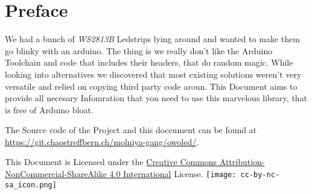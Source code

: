 \section*{Preface}
We had a bunch of \textit{WS2813B} Led\-strips lying around and wanted to make them go blinky with an arduino.
The thing is we really don't like the Arduino Toolchain and code that includes their headers, that do random magic.
While looking into alternatives we discovered that most existing solutions weren't very versatile and relied on  copying third party code aroun.
\bigbreak
This Document aims to provide all necesary Infomration that you need to use this marvelous library, that is free of Arduino bloat. 

The Source code of the Project and this doccument can be found at \url{https://git.chaostreffbern.ch/molniya-gang/owoled/}.

This Document is Licensed under the \href{https://creativecommons.org/licenses/by-nc-sa/4.0/}{Creative Commons Attribution-NonCommercial-ShareAlike 4.0 International} License.
\bigbreak
\texttt{[image: cc-by-nc-sa\_icon.png]}
\bigbreak
